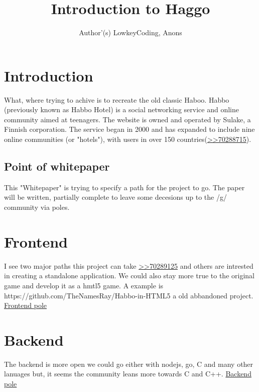 \documentclass{article}
\begin{document}
\title{Introduction to Haggo}
\author{Author'(s) LowkeyCoding, Anons}

\maketitle

\section{Introduction}
What, where trying to achive is to recreate the old classic Haboo. Habbo (previously known as Habbo Hotel) is a social networking service and online community aimed at teenagers. The website is owned and operated by Sulake, a Finnish corporation. The service began in 2000 and has expanded to include nine online communities (or "hotels"), with users in over 150 countries(\href{https://boards.4channel.org/g/thread/70288715#p70288715}{\textgreater\textgreater 70288715}).

\subsection{Point of whitepaper}
This "Whitepaper" is trying to specify a path for the project to go. The paper will be written, partially complete to leave some decesions up to the /g/ community via poles.

\section{Frontend}
I see two major paths this project can take \href{https://boards.4channel.org/g/thread/70288715#p70288715}{\textgreater \textgreater 70289125} and others are intrested in creating a standalone application. We could also stay more true to the original game and develop it as a hmtl5 game. A example is https://github.com/TheNamesRay/Habbo-in-HTML5 a old abbandoned project.
    \href{https://www.strawpoll.me/17681082}{Frontend pole}
 \section{Backend}
The backend is more open we could go either with nodejs, go, C and many other lanuages but, it seems the community leans more towards C and C++.
    \href{https://www.strawpoll.me/17681079}{Backend pole}
\end{document}
